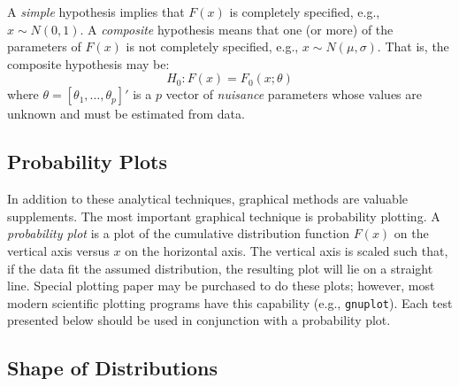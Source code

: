 \documentclass[draft]{article}
\begin{document}
A {\em simple\/} hypothesis implies that \(F\left(x\right)\)
is completely specified, e.g., \(x\sim N\left(0,1\right)\).
A {\em composite\/} hypothesis means that
one (or more) of the parameters of \(F\left(x\right)\)
is not completely specified, e.g.,  \(x\sim N\left(\mu,\sigma\right)\).
That is, the composite hypothesis may be:
\begin{displaymath}
H_0 : F\left(x\right) = F_0\left(x; \theta\right)
\end{displaymath}
where \(\theta=\left[\theta_1, \ldots,\theta_p\right]'\)
is a \(p\) vector of \emph{nuisance} parameters whose values
are unknown and must be estimated from data.


\subsection{Probability Plots}

In addition to these analytical techniques, graphical
methods are valuable supplements. The most important
graphical technique is probability plotting. A \emph{probability plot}
\label{pplot}
is a plot of the cumulative distribution function \(F\left(x\right)\)
on the vertical axis versus \(x\) on the horizontal axis.
The vertical axis is scaled such that, if the data fit
the assumed distribution, the resulting plot will lie on
a straight line. Special plotting paper may be purchased
to do these plots; however, most modern scientific
plotting programs have this capability (e.g., {\tt gnuplot}).
Each test presented below
should be used in conjunction with a probability plot.

\subsection{Shape of Distributions}
\end{document}
